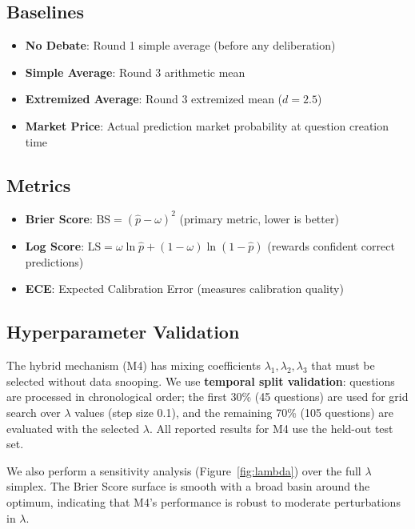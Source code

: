 \documentclass[conference]{IEEEtran}
\begin{document}
\subsection{Baselines}

\begin{itemize}
    \item \textbf{No Debate}: Round 1 simple average (before any deliberation)
    \item \textbf{Simple Average}: Round 3 arithmetic mean
    \item \textbf{Extremized Average}: Round 3 extremized mean ($d=2.5$) \cite{baron2014two}
    \item \textbf{Market Price}: Actual prediction market probability at question creation time
\end{itemize}

\subsection{Metrics}

\begin{itemize}
    \item \textbf{Brier Score}: $\text{BS} = (\hat{p} - \omega)^2$ (primary metric, lower is better)
    \item \textbf{Log Score}: $\text{LS} = \omega \ln \hat{p} + (1-\omega) \ln(1-\hat{p})$ (rewards confident correct predictions)
    \item \textbf{ECE}: Expected Calibration Error (measures calibration quality)
\end{itemize}

\subsection{Hyperparameter Validation}

The hybrid mechanism (M4) has mixing coefficients $\lambda_1, \lambda_2, \lambda_3$ that must be selected without data snooping. We use \textbf{temporal split validation}: questions are processed in chronological order; the first 30\% (45 questions) are used for grid search over $\lambda$ values (step size 0.1), and the remaining 70\% (105 questions) are evaluated with the selected $\lambda$. All reported results for M4 use the held-out test set.

We also perform a sensitivity analysis (Figure~\ref{fig:lambda}) over the full $\lambda$ simplex. The Brier Score surface is smooth with a broad basin around the optimum, indicating that M4's performance is robust to moderate perturbations in $\lambda$.
\end{document}
